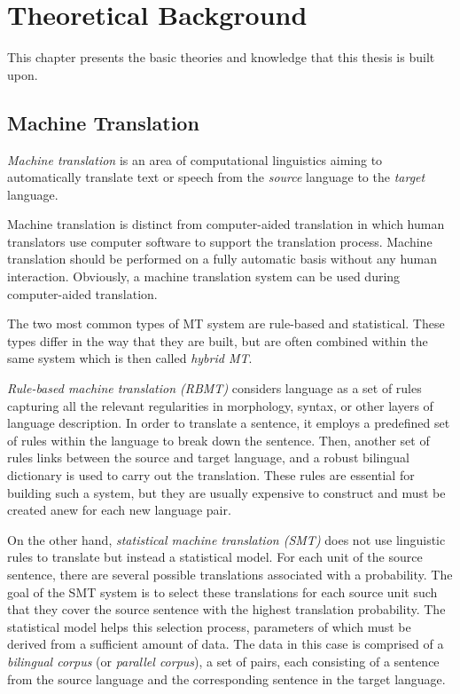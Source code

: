 \chapter{Theoretical Background}
\label{the}
This chapter presents the basic theories and knowledge that this thesis is built upon.

\section{Machine Translation}
\label{the-mt}

\textit{Machine translation} is an area of computational linguistics aiming to automatically translate text or speech from the \textit{source} language to the \textit{target} language.

Machine translation is distinct from computer-aided translation in which human translators use computer software to support the translation process.
Machine translation should be performed on a fully automatic basis without any human interaction. 
Obviously, a machine translation system can be used during computer-aided translation.

The two most common types of MT system are rule-based and statistical.
These types differ in the way that they are built, but are often combined within the same system which is then called \textit{hybrid MT}.

\textit{Rule-based machine translation (RBMT)} considers language as a set of rules capturing all the relevant regularities in morphology, syntax, or other layers of language description.
In order to translate a sentence, it employs a predefined set of rules within the language to break down the sentence.
Then, another set of rules links between the source and target language, and a robust bilingual dictionary is used to carry out the translation.
These rules are essential for building such a system, but they are usually expensive to construct and must be created anew for each new language pair.

On the other hand, \textit{statistical machine translation (SMT)} does not use linguistic rules to translate but instead a statistical model.
For each unit of the source sentence, there are several possible translations associated with a probability.
The goal of the SMT system is to select these translations for each source unit such that they cover the source sentence with the highest translation probability.
The statistical model helps this selection process, parameters of which must be derived from a sufficient amount of data.
The data in this case is comprised of a \textit{bilingual corpus} (or \textit{parallel corpus}), a set of pairs, each consisting of a sentence from the source language and the corresponding sentence in the target language.

